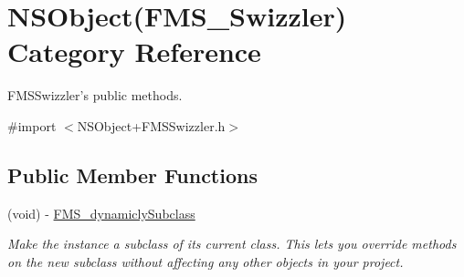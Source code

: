 \hypertarget{category_n_s_object_07_f_m_s___swizzler_08}{\section{N\-S\-Object(F\-M\-S\-\_\-\-Swizzler) Category Reference}
\label{category_n_s_object_07_f_m_s___swizzler_08}
}


F\-M\-S\-Swizzler's public methods.  




{\ttfamily \#import $<$N\-S\-Object+\-F\-M\-S\-Swizzler.\-h$>$}

\subsection*{Public Member Functions}
\begin{DoxyCompactItemize}
\item 
(void) -\/ \hyperlink{category_n_s_object_07_f_m_s___swizzler_08_ad66725b3dc5baf8c59142e2647cf4f37}{F\-M\-S\-\_\-dynamicly\-Subclass}
\begin{DoxyCompactList}\small\item\em Make the instance a subclass of its current class. This lets you override methods on the new subclass without affecting any other objects in your project. \end{DoxyCompactList}\end{DoxyCompactItemize}
